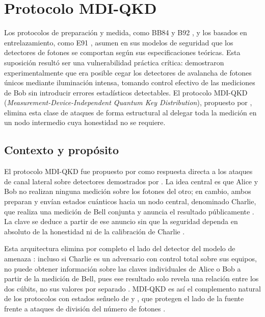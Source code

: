 \section{Protocolo MDI-QKD}
 
Los protocolos de preparación y medida, como BB84 \citep{bennett1984} y B92 \citep{bennett1992}, y los basados en entrelazamiento, como E91 \citep{ekert1991}, asumen en sus modelos de seguridad que los detectores de fotones se comportan según sus especificaciones teóricas. Esta suposición resultó ser una vulnerabilidad práctica crítica: \cite{lydersen2010} demostraron experimentalmente que era posible cegar los detectores de avalancha de fotones únicos mediante iluminación intensa, tomando control efectivo de las mediciones de Bob sin introducir errores estadísticos detectables. El protocolo MDI-QKD (\emph{Measurement-Device-Independent Quantum Key Distribution}), propuesto por \cite{lo2012}, elimina esta clase de ataques de forma estructural al delegar toda la medición en un nodo intermedio cuya honestidad no se requiere.
 
\subsection{Contexto y propósito}
 
El protocolo MDI-QKD fue propuesto por \cite{lo2012} como respuesta directa a los ataques de canal lateral sobre detectores demostrados por \cite{lydersen2010}. La idea central es que Alice y Bob no realizan ninguna medición sobre los fotones del otro; en cambio, ambos preparan y envían estados cuánticos hacia un nodo central, denominado Charlie, que realiza una medición de Bell conjunta y anuncia el resultado públicamente \citep{lo2012,braunstein2012}. La clave se deduce a partir de ese anuncio sin que la seguridad dependa en absoluto de la honestidad ni de la calibración de Charlie \citep{lo2012,curty2014}.
 
Esta arquitectura elimina por completo el lado del detector del modelo de amenaza \citep{lo2012}: incluso si Charlie es un adversario con control total sobre sus equipos, no puede obtener información sobre las claves individuales de Alice o Bob a partir de la medición de Bell, pues ese resultado solo revela una relación entre los dos cúbits, no sus valores por separado \citep{lo2012,braunstein2012}. MDI-QKD es así el complemento natural de los protocolos con estados señuelo de \cite{lo2005} y \cite{wang2005}, que protegen el lado de la fuente frente a ataques de división del número de fotones \citep{hwang2003}.
 
